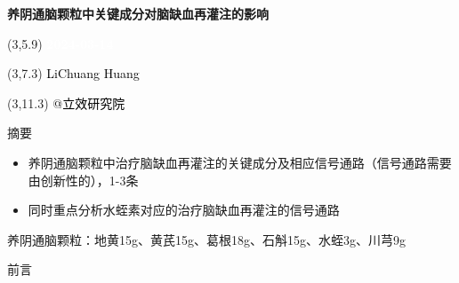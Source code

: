 \documentclass[
  ignorenonframetext,
]{beamer}
\author{}
\date{\vspace{-2.5em}}
\providecommand{\tightlist}{%
  \setlength{\itemsep}{0pt}\setlength{\parskip}{0pt}}
\begin{document}
\begin{frame}
\begin{titlepage} 
\begin{center} \textbf{\Huge
养阴通脑颗粒中关键成分对脑缺血再灌注的影响}
\vspace{4em} \begin{textblock}{10}(3,5.9) \huge
\textbf{\textcolor{white}{2024-03-14}}
\end{textblock} \begin{textblock}{10}(3,7.3)
\Large \textcolor{black}{LiChuang Huang}
\end{textblock} \begin{textblock}{10}(3,11.3)
\Large \textcolor{black}{@立效研究院}
\end{textblock} \end{center} \end{titlepage}
\restoregeometry


\tableofcontents

\listoffigures

\listoftables



\end{frame}

\begin{frame}{摘要}
\protect\hypertarget{abstract}{}
\begin{itemize}
\tightlist
\item
  养阴通脑颗粒中治疗脑缺血再灌注的关键成分及相应信号通路（信号通路需要由创新性的），1-3条
\item
  同时重点分析水蛭素对应的治疗脑缺血再灌注的信号通路
\end{itemize}

养阴通脑颗粒：地黄15g、黄芪15g、葛根18g、石斛15g、水蛭3g、川芎9g
\end{frame}

\begin{frame}{前言}
\protect\hypertarget{introduction}{}
\end{frame}
\end{document}

